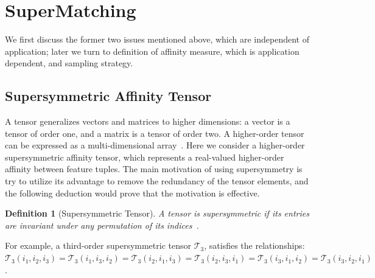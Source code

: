 \section{SuperMatching}
\label{sec:supersymhopm}
We first discuss the former two issues mentioned above, which are independent of application; later we turn to definition of affinity measure, which is application dependent, and sampling strategy.


\subsection{Supersymmetric Affinity Tensor}
\label{subsec:supersymtensor}

A tensor generalizes vectors and matrices to higher dimensions: a vector is a tensor of order one,
and a matrix is a tensor of order two. A higher-order tensor can be expressed as a multi-dimensional array~\cite{Kolda08}.
Here we consider a higher-order supersymmetric affinity tensor, which represents a real-valued higher-order affinity between feature tuples.
The main motivation of using supersymmetry is try to utilize its advantage to remove the redundancy of the tensor elements,
and the following deduction would prove that the motivation is effective.

\newtheorem{mot}{Definition}
\begin{mot}[Supersymmetric Tensor]
\label{mot:def1}
A tensor is  \emph{supersymmetric} if its entries are invariant under any permutation of its indices~\cite{Kofidis02}.
\end{mot}

For example, a third-order supersymmetric tensor $\mathcal{T}_3$, satisfies the relationships:
$\mathcal{T}_3(i_1, i_2, i_3)=\mathcal{T}_3(i_1, i_3, i_2)=\mathcal{T}_3(i_2, i_1, i_3)=\mathcal{T}_3(i_2, i_3, i_1)=\mathcal{T}_3(i_3, i_1, i_2)=\mathcal{T}_3(i_3, i_2, i_1)$.

